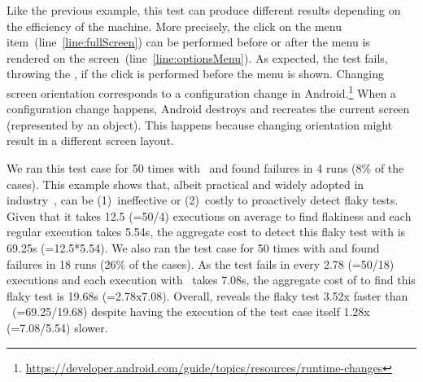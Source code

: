 \documentclass[conference]{IEEEtran}
\begin{document}
Like the previous example, this test can produce different results depending on the efficiency of the machine. More precisely, the click on the menu item~(line~\ref{line:fullScreen}) can be performed before or after the menu is rendered on the screen~(line~\ref{line:optionsMenu}). 
As expected, the test fails, throwing the , if the click is performed before the menu is shown. 
Changing screen orientation corresponds to a configuration change in Android.\footnote{\url{https://developer.android.com/guide/topics/resources/runtime-changes}} When a configuration change happens, Android destroys and recreates the current screen (represented by an  object). This happens because changing orientation might result in a different screen layout.%

We ran this test case for 50 times with \rerun\ and found failures in 4 runs (8\% of the cases). This example shows that, albeit practical and widely adopted in industry~\cite{Luo:2014:EAF:2635868.2635920,DBLP:conf/scam/HarmanO18,john-mico-google2016}, \rerun{} can be (1)~ineffective or (2)~costly to proactively detect flaky tests. Given that it takes 12.5 (=50/4) executions on average to find flakiness and each regular execution takes 5.54s, the aggregate cost to detect this flaky test with \rerun{} is 69.25s (=12.5*5.54). We also ran the test case for 50 times with \tname{} and found failures in 18 runs (26\% of the cases). As the test fails in every 2.78 (=50/18) executions and each execution with \tname\ takes 7.08s, the aggregate cost of \tname{} to find this flaky test is 19.68s (=2.78x7.08). Overall, \tname{} reveals the flaky test 3.52x faster than \rerun\ (=69.25/19.68) despite having the execution of the test case itself 1.28x (=7.08/5.54) slower.
\end{document}
